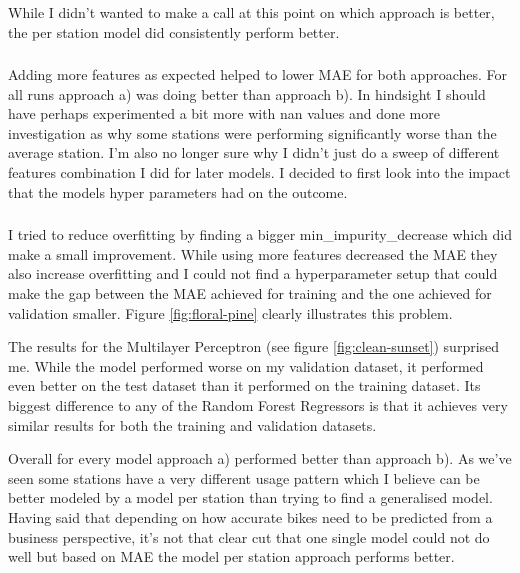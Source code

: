 \documentclass[a4paper]{article}
\begin{document}
    While I didn't wanted to make a call at this point on which approach is better, the per station model did consistently
    perform better.

    \subsubsection*{}
    Adding more features as expected helped to lower MAE for both approaches. For all runs approach a) was
    doing better than approach b). In hindsight I should have perhaps experimented a bit more with nan values and
    done more investigation as why some stations were performing significantly worse than the average station. I'm also
    no longer sure why I didn't just do a sweep of different features combination I did for later models.
    I decided to first look into the impact that the models hyper parameters had on the outcome.

    \subsubsection*{}

    I tried to reduce overfitting by finding a bigger min\_impurity\_decrease which did make
    a small improvement. While using more features decreased the MAE they also increase overfitting and I
    could not find a hyperparameter setup that could make the gap between the MAE achieved for training and the one achieved
    for validation smaller. Figure \ref{fig:floral-pine} clearly illustrates this problem.

    The results for the Multilayer Perceptron (see figure \ref{fig:clean-sunset}) surprised me. While the model performed
    worse on my validation dataset, it performed even better on the test dataset than it performed on the training dataset.
    Its biggest difference to any of the Random Forest Regressors is that it achieves very similar results for both the
    training and validation datasets.

    Overall for every model approach a) performed better than approach b). As we've seen some stations have a very different
    usage pattern which I believe can be better modeled by a model per station than trying to find a generalised model.
    Having said that depending on how accurate bikes need to be predicted from a business perspective, it's not that clear
    cut that one single model could not do well but based on MAE the model per station approach performs better.
\end{document}
